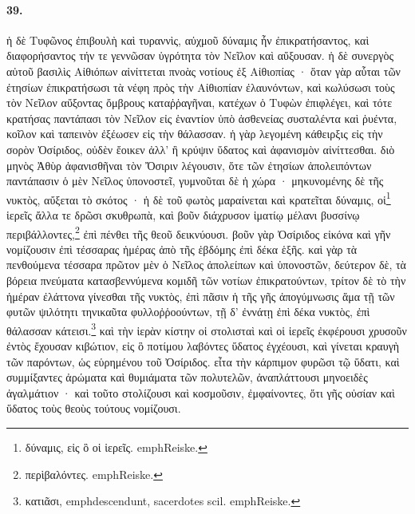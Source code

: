 \documentclass[a4paper, 11pt, oneside, polutonikogreek, german]{article}
\begin{document}
\paragraph{39.}
ἡ δὲ Τυφῶνος ἐπιβουλὴ καὶ τυραννὶς, αὐχμοῦ δύναμις ἦν ἐπικρατήσαντος, καὶ διαφορήσαντος τήν τε γεννῶσαν ὑγρότητα τὸν Νεῖλον καὶ αὔξουσαν. ἡ δὲ συνεργὸς αὐτοῦ βασιλὶς Αἰθιόπων αἰνίττεται πνοὰς νοτίους ἐξ Αἰθιοπίας · ὅταν γὰρ αὗται τῶν ἐτησίων ἐπικρατήσωσι τὰ νέφη πρὸς τὴν Αἰθιοπίαν ἐλαυνόντων, καὶ κωλύσωσι τοὺς τὸν Νεῖλον αὔξοντας ὄμβρους καταῤῥαγῆναι, κατέχων ὁ Τυφὼν ἐπιφλέγει, καὶ τότε κρατήσας παντάπασι τὸν Νεῖλον εἰς ἑναντίον ὑπὸ ἀσθενείας συσταλέντα καὶ ῥυέντα, κοῖλον καὶ ταπεινὸν ἐξέωσεν εἰς τὴν θάλασσαν. ἡ γὰρ λεγομένη κάθειρξις εἰς τὴν σορὸν Ὀσίριδος, οὐδὲν ἔοικεν ἀλλ' ἢ κρύψιν ὕδατος καὶ ἀφανισμὸν αἰνίττεσθαι. διὸ μηνὸς Ἀθὺρ ἀφανισθῆναι τὸν Ὄσιριν λέγουσιν, ὅτε τῶν ἐτησίων ἀπολειπόντων παντάπασιν ὁ μὲν Νεῖλος ὑπονοστεῖ, γυμνοῦται δὲ ἡ χώρα · μηκυνομένης δὲ τῆς νυκτὸς, αὔξεται τὸ σκότος · ἡ δὲ τοῦ φωτὸς μαραίνεται καὶ κρατεῖται δύναμις, οἱ\footnote{δύναμις, εἰς ὃ οἱ ἱερεῖς. emph{Reiske.}} ἱερεῖς ἄλλα τε δρῶσι σκυθρωπὰ, καὶ βοῦν διάχρυσον ἱματίῳ μέλανι βυσσίνῳ περιβάλλοντες,\footnote{περὶβαλόντες. emph{Reiske.}} ἐπὶ πένθει τῆς θεοῦ δεικνύουσι. βοῦν γὰρ Ὀσίριδος εἰκόνα καὶ γῆν νομίζουσιν ἐπὶ τέσσαρας ἡμέρας ἀπὸ τῆς ἑβδόμης ἐπὶ δέκα ἑξῆς. καὶ γὰρ τὰ πενθούμενα τέσσαρα πρῶτον μὲν ὁ Νεῖλος ἀπολείπων καὶ ὑπονοστῶν, δεύτερον δὲ, τὰ βόρεια πνεύματα κατασβεννύμενα κομιδῆ τῶν νοτίων ἐπικρατούντων, τρίτον δὲ τὸ τὴν ἡμέραν ἐλάττονα γίνεσθαι τῆς νυκτὸς, ἐπὶ πᾶσιν ἡ τῆς γῆς ἀπογύμνωσις ἅμα τῇ τῶν φυτῶν ψιλότητι τηνικαῦτα φυλλοῤῥοούντων, τῇ δ' ἐννάτῃ ἐπὶ δέκα νυκτὸς, ἐπὶ θάλασσαν κάτεισι.\footnote{κατιᾶσι, emph{descendunt}, sacerdotes scil. emph{Reiske.}} καὶ τὴν ἱερὰν κίστην οἱ στολισταὶ καὶ οἱ ἱερεῖς ἐκφέρουσι χρυσοῦν ἐντὸς ἔχουσαν κιβώτιον, εἰς ὃ ποτίμου λαβόντες ὕδατος ἐγχέουσι, καὶ γίνεται κραυγὴ τῶν παρόντων, ὡς εὑρημένου τοῦ Ὀσίριδος. εἶτα τὴν κάρπιμον φυρῶσι τῷ ὕδατι, καὶ συμμίξαντες ἀρώματα καὶ θυμιάματα τῶν πολυτελῶν, ἀναπλάττουσι μηνοειδὲς ἀγαλμάτιον · καὶ τοῦτο στολίζουσι καὶ κοσμοῦσιν, ἐμφαίνοντες, ὅτι γῆς οὐσίαν καὶ ὕδατος τοὺς θεοὺς τούτους νομίζουσι.
\end{document}
